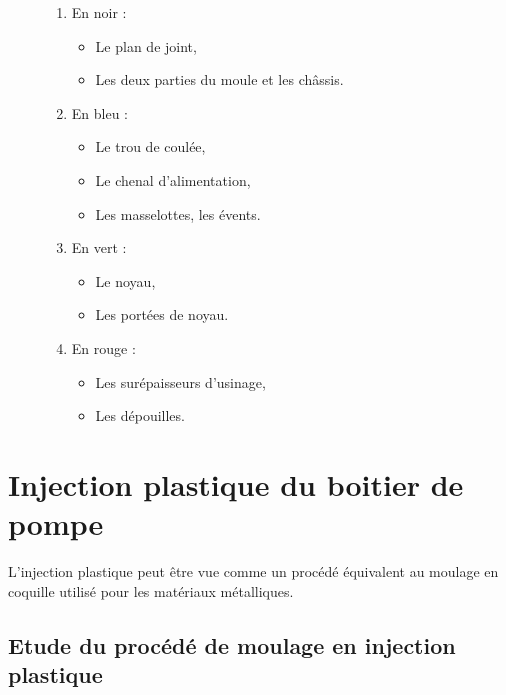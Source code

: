 \begin{figure}[!h]
 \begin{minipage}{0.49\linewidth}
\begin{enumerate}
\item En noir :
 \begin{itemize}
  \item Le plan de joint,
  \item Les deux parties du moule et les châssis.
 \end{itemize}
 \item En bleu :
 \begin{itemize}
  \item Le trou de coulée,
  \item Le chenal d'alimentation,
  \item Les masselottes, les évents.
 \end{itemize}
\end{enumerate}
 \end{minipage}
 \hfill
  \begin{minipage}{0.49\linewidth}
\begin{enumerate}
\setcounter{enumi}{2}
 \item En vert :
 \begin{itemize}
  \item Le noyau,
  \item Les portées de noyau.
 \end{itemize}
 \item En rouge :
 \begin{itemize}
  \item Les surépaisseurs d'usinage,
  \item Les dépouilles.
 \end{itemize}
\end{enumerate}
 \end{minipage}
\end{figure}


\section{Injection plastique du boitier de pompe}

L'injection plastique peut être vue comme un procédé équivalent au moulage en coquille utilisé pour les matériaux métalliques.

\subsection{Etude du procédé de moulage en injection plastique}


